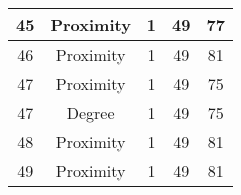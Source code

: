 \documentclass[results.tex]{subfiles}
\begin{document}
\begin{center}
\begin{tabular}{| c || c | c | c | c |}
            \hline
            45                      & Proximity                    & 1                      & 49                      & 77                   \\
            \hline
            46                      & Proximity                    & 1                      & 49                      & 81                   \\
            \hline
            47                      & Proximity                    & 1                      & 49                      & 75                   \\
            \hline
            47                      & Degree                       & 1                      & 49                      & 75                   \\
            \hline
            48                      & Proximity                    & 1                      & 49                      & 81                   \\
            \hline
            49                      & Proximity                    & 1                      & 49                      & 81                   \\
            \hline
        \end{tabular}
    \end{center}
\end{document}

